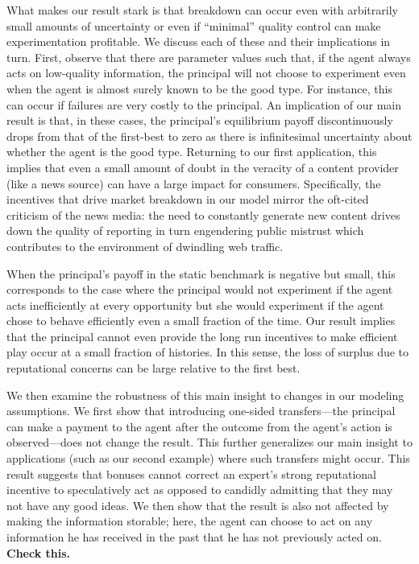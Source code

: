 \documentclass[11pt,reqno]{amsart}
\begin{document}
What makes our result stark is that breakdown can occur even with arbitrarily small amounts of uncertainty or even if ``minimal'' quality control can make experimentation profitable. We discuss each of these and their implications in turn. First, observe that there are parameter values such that, if the agent always acts on low-quality information, the principal will not choose to experiment even when the agent is almost surely known to be the good type. For instance, this can occur if failures are very costly to the principal. An implication of our main result is that, in these cases, the principal's equilibrium payoff discontinuously drops from that of the first-best to zero as there is infinitesimal uncertainty about whether the agent is the good type. Returning to our first application, this implies that even a small amount of doubt in the veracity of a content provider (like a news source) can have a large impact for consumers. Specifically, the incentives that drive market breakdown in our model mirror the oft-cited criticism of the news media: the need to constantly generate new content drives down the quality of reporting in turn engendering public mistrust which contributes to the environment of dwindling web traffic.

When the principal's payoff in the static benchmark is negative but small, this corresponds to the case where the principal would not experiment if the agent acts inefficiently at every opportunity but she would experiment if the agent chose to behave efficiently even a small fraction of the time. Our result implies that the principal cannot even provide the long run incentives to make efficient play occur at a small fraction of histories. In this sense, the loss of surplus due to reputational concerns can be large relative to the first best.

We then examine the robustness of this main insight to changes in our modeling assumptions. We first show that introducing one-sided transfers---the principal can make a payment to the agent after the outcome from the agent's action is observed---does not change the result. This further generalizes our main insight to applications (such as our second example) where such transfers might occur. This result suggests that bonuses cannot correct an expert's strong reputational incentive to speculatively act as opposed to candidly admitting that they may not have any good ideas. We then show that the result is also not affected by making the information storable; here, the agent can choose to act on any information he has received in the past that he has not previously acted on. \textbf{Check this.}
\end{document}
